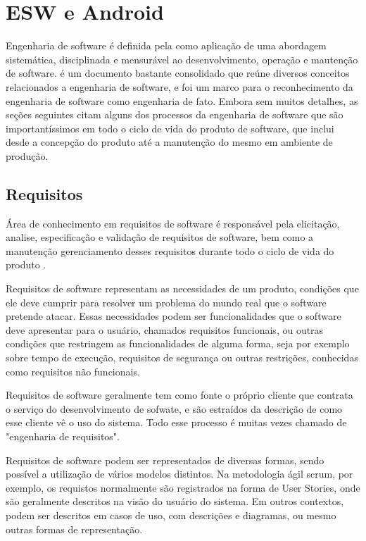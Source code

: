 \chapter{ESW e Android}
\label{cap:eswandroid}

Engenharia de software é definida pela  como aplicação de uma abordagem sistemática, disciplinada e mensurável ao desenvolvimento, operação e mautenção de software.  é um documento bastante consolidado que reúne diversos conceitos relacionados a engenharia de software, e foi um marco para o reconhecimento da engenharia de software como engenharia de fato. Embora sem muitos detalhes, as seções seguintes citam alguns dos processos da engenharia de software que são importantíssimos em todo o ciclo de vida do produto de software, que inclui desde a concepção do produto até a manutenção do mesmo em ambiente de produção.


\section{Requisitos}

Área de conhecimento em requisitos de software é responsável pela elicitação, analise, especificação e validação de requisitos de software, bem como a manutenção gerenciamento desses requisitos durante todo o ciclo de vida do produto \cite{swebok}.

Requisitos de software representam as necessidades de um produto, condições que ele deve cumprir para resolver um problema do mundo real que o software pretende atacar. Essas necessidades podem ser funcionalidades que o software deve apresentar para o usuário, chamados requisitos funcionais, ou outras condições que restringem as funcionalidades de alguma forma, seja por exemplo sobre tempo de execução, requisitos de segurança ou outras restrições, conhecidas como requisitos não funcionais.

Requisitos de software geralmente tem como fonte o próprio cliente que contrata o serviço do desenvolvimento de sofwate, e são estraídos da descrição de como esse cliente vê o uso do sistema. Todo esse processo é muitas vezes chamado de "engenharia de requisitos".

Requisitos de software podem ser representados de diversas formas, sendo possível a utilização de vários modelos distintos. Na metodologia ágil scrum, por exemplo, os requistos normalmente são registrados na forma de User Stories, onde são geralmente descritos na visão do usuário do sistema. Em outros contextos, podem ser descritos em casos de uso, com descrições e diagramas, ou mesmo outras formas de representação.

